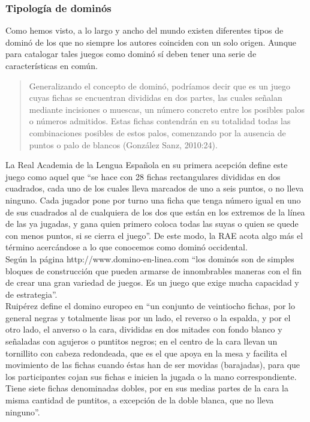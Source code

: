 \subsubsection{Tipología de dominós}

Como hemos visto, a lo largo y ancho del mundo existen diferentes tipos de dominó de los que no
siempre los autores coinciden con un solo origen. Aunque para catalogar tales juegos como dominó sí
deben tener una serie de características en común. 

\begin{quote}
Generalizando el concepto de dominó, podríamos decir que es un juego cuyas fichas se encuentran
divididas en dos partes, las cuales señalan mediante incisiones o muescas, un número concreto entre
los posibles palos o números admitidos. Estas fichas contendrán en su totalidad todas las
combinaciones posibles de estos palos, comenzando por la ausencia de puntos o palo de blancos
(González Sanz, 2010:24).
\end{quote}

La Real Academia de la Lengua Española en su primera acepción define este juego como aquel que
“se hace con 28 fichas rectangulares divididas en dos cuadrados, cada uno de los cuales lleva marcados
de uno a seis puntos, o no lleva ninguno. Cada jugador pone por turno una ficha que tenga número
igual en uno de sus cuadrados al de cualquiera de los dos que están en los extremos de la línea de
las ya jugadas, y gana quien primero coloca todas las suyas o quien se quede con menos puntos, si
se cierra el juego”. De este modo, la RAE acota algo más el término acercándose a lo que conocemos
como dominó occidental. \\

Según la página http://www.domino-en-linea.com “los dominós son de simples bloques de construcción
que pueden armarse de innombrables maneras con el fin de crear una gran variedad de juegos. Es un
juego que exige mucha capacidad y de estrategia”. \\

Ruipérez define el domino europeo en “un conjunto de veintiocho fichas, por lo general negras y
totalmente lisas por un lado, el reverso o la espalda, y por el otro lado, el anverso o la cara,
divididas en dos mitades con fondo blanco y señaladas con agujeros o puntitos negros; en el centro
de la cara llevan un tornillito con cabeza redondeada, que es el que apoya en la mesa y facilita
el movimiento de las fichas cuando éstas han de ser movidas (barajadas), para que los participantes
cojan sus fichas e inicien la jugada o la mano correspondiente. Tiene siete fichas denominadas
dobles, por en sus medias partes de la cara la misma cantidad de puntitos, a excepción de la
doble blanca, que no lleva ninguno”.

